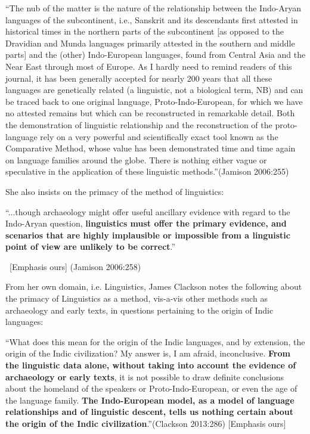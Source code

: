 \begin{myquote}
“The nub of the matter is the nature of the relationship between the Indo-Aryan languages of the subcontinent, i.e., Sanskrit and its descendants first attested in historical times in the northern parts of the subcontinent [as opposed to the Dravidian and Munda languages primarily attested in the southern and middle parts] and the (other) Indo-European languages, found from Central Asia and the Near East through most of Europe. As I hardly need to remind readers of this journal, it has been generally accepted for nearly 200 years that all these languages are genetically related (a linguistic, not a biological term, NB) and can be traced back to one original language, Proto-Indo-European, for which we have no attested remains but which can be reconstructed in remarkable detail. Both the demonstration of linguistic relationship and the reconstruction of the proto-language rely on a very powerful and scientifically exact tool known as the Comparative Method, whose value has been demonstrated time and time again on language families around the globe. There is nothing either vague or speculative in the application of these linguistic methods.”\hfill (Jamison 2006:255)
\end{myquote}

She also insists on the primacy of the method of linguistics:

\begin{myquote}
“...though archaeology might offer useful ancillary evidence with regard to the Indo-Aryan question, \textbf{linguistics must offer the primary evidence, and scenarios that are highly implausible or impossible from a linguistic point of view are unlikely to be correct}.” 

~\hfill [Emphasis ours] (Jamison 2006:258)
\end{myquote}

From her own domain, i.e. Linguistics, James Clackson notes the following about the primacy of Linguistics as a method, vis-a-vis other methods such as archaeology and early texts, in questions pertaining to the origin of Indic languages:

\begin{myquote}
“What does this mean for the origin of the Indic languages, and by extension, the origin of the Indic civilization? My answer is, I am afraid, inconclusive. \textbf{From the linguistic data alone, without taking into account the evidence of archaeology or early texts}, it is not possible to draw definite conclusions about the homeland of the speakers or Proto-Indo-European, or even the age of the language family. \textbf{The Indo-European model, as a model of language relationships and of linguistic descent, tells us nothing certain about the origin of the Indic civilization}.”\hfill (Clackson 2013:286) [Emphasis ours]
\end{myquote}

